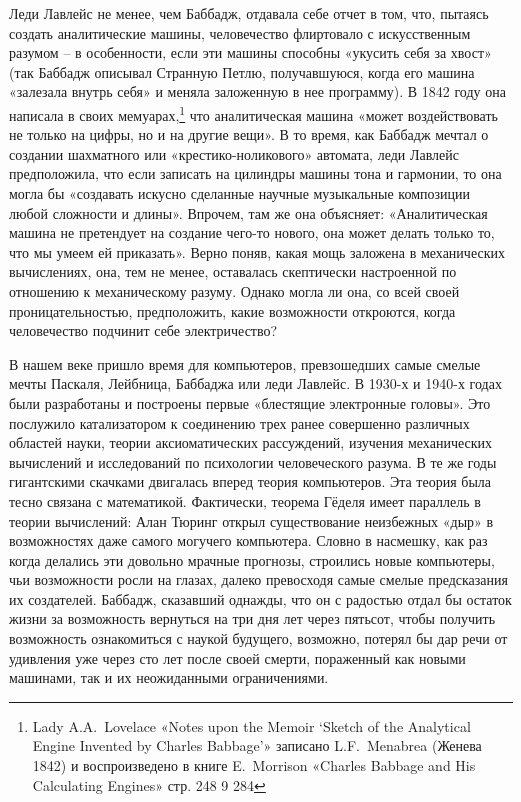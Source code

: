 \documentclass[../main.tex]{subfiles}
\begin{document}
Леди Лавлейс не менее, чем Баббадж, отдавала себе отчет в том, что, пытаясь создать аналитические машины, человечество флиртовало с искусственным разумом \--- в особенности, если эти машины способны «укусить себя за хвост» (так Баббадж описывал Странную Петлю, получавшуюся, когда его машина «залезала внутрь себя» и меняла заложенную в нее программу). В 1842 году она написала в своих мемуарах,\footnote{Lady A.A.~Lovelace «Notes upon the Memoir \enquote*{Sketch of the Analytical Engine Invented by Charles Babbage}» записано L.F.~Menabrea (Женева 1842) и воспроизведено в книге E.~Morrison «Charles Babbage and His Calculating Engines» стр. 248 9 284} что аналитическая машина «может воздействовать не только на цифры, но и на другие вещи». В то время, как Баббадж мечтал о создании шахматного или «крестико-ноликового» автомата, леди Лавлейс предположила, что если записать на цилиндры машины тона и гармонии, то она могла бы «создавать искусно сделанные научные музыкальные композиции любой сложности и длины». Впрочем, там же она объясняет: «Аналитическая машина не претендует на создание чего-то нового, она может делать только то, что мы умеем ей приказать». Верно поняв, какая мощь заложена в механических вычислениях, она, тем не менее, оставалась скептически настроенной по отношению к механическому разуму. Однако могла ли она, со всей своей проницательностью, предположить, какие возможности откроются, когда человечество подчинит себе электричество?

В нашем веке пришло время для компьютеров, превзошедших самые смелые мечты Паскаля, Лейбница, Баббаджа или леди Лавлейс. В 1930-х и 1940-х годах были разработаны и построены первые «блестящие электронные головы». Это послужило катализатором к соединению трех ранее совершенно различных областей науки, теории аксиоматических рассуждений, изучения механических вычислений и исследований по психологии человеческого разума. В те же годы гигантскими скачками двигалась вперед теория компьютеров. Эта теория была тесно связана с математикой. Фактически, теорема Гёделя имеет параллель в теории вычислений: Алан Тюринг открыл существование неизбежных «дыр» в возможностях даже самого могучего компьютера. Словно в насмешку, как раз когда делались эти довольно мрачные прогнозы, строились новые компьютеры, чьи возможности росли на глазах, далеко превосходя самые смелые предсказания их создателей. Баббадж, сказавший однажды, что он с радостью отдал бы остаток жизни за возможность вернуться на три дня лет через пятьсот, чтобы получить возможность ознакомиться с наукой будущего, возможно, потерял бы дар речи от удивления уже через сто лет после своей смерти, пораженный как новыми машинами, так и их неожиданными ограничениями.
\end{document}
